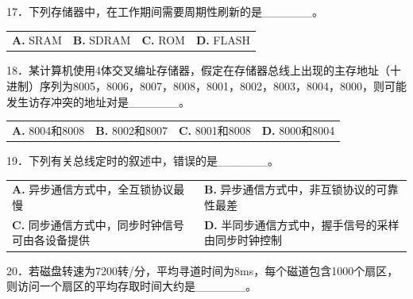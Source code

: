 \documentclass[UTF8,11pt]{ctexart}
\begin{document}
17．下列存储器中，在工作期间需要周期性刷新的是\_\_\_\_\_\_。


\begin{center}\begin{tabular}{>{\raggedright\arraybackslash}p{\dimexpr(\linewidth-8\tabcolsep)/4\relax}>{\raggedright\arraybackslash}p{\dimexpr(\linewidth-8\tabcolsep)/4\relax}>{\raggedright\arraybackslash}p{\dimexpr(\linewidth-8\tabcolsep)/4\relax}>{\raggedright\arraybackslash}p{\dimexpr(\linewidth-8\tabcolsep)/4\relax}}
\textbf{A.} SRAM & \textbf{B.} SDRAM & \textbf{C.} ROM & \textbf{D.} FLASH\\[.35em]\end{tabular}\end{center}

18．某计算机使用4体交叉编址存储器，假定在存储器总线上出现的主存地址（十进制）序列为8005，8006，8007，8008，8001，8002，8003，8004，8000，则可能发生访存冲突的地址对是\_\_\_\_\_\_。


\begin{center}\begin{tabular}{>{\raggedright\arraybackslash}p{\dimexpr(\linewidth-8\tabcolsep)/4\relax}>{\raggedright\arraybackslash}p{\dimexpr(\linewidth-8\tabcolsep)/4\relax}>{\raggedright\arraybackslash}p{\dimexpr(\linewidth-8\tabcolsep)/4\relax}>{\raggedright\arraybackslash}p{\dimexpr(\linewidth-8\tabcolsep)/4\relax}}
\textbf{A.} 8004和8008 & \textbf{B.} 8002和8007 & \textbf{C.} 8001和8008 & \textbf{D.} 8000和8004\\[.35em]\end{tabular}\end{center}

19．下列有关总线定时的叙述中，错误的是\_\_\_\_\_\_。


\begin{center}\begin{tabular}{>{\raggedright\arraybackslash}p{\dimexpr(\linewidth-4\tabcolsep)/2\relax}>{\raggedright\arraybackslash}p{\dimexpr(\linewidth-4\tabcolsep)/2\relax}}
\textbf{A.} 异步通信方式中，全互锁协议最慢 & \textbf{B.} 异步通信方式中，非互锁协议的可靠性最差\\[.35em]
\textbf{C.} 同步通信方式中，同步时钟信号可由各设备提供 & \textbf{D.} 半同步通信方式中，握手信号的采样由同步时钟控制\\[.35em]\end{tabular}\end{center}

20．若磁盘转速为7200转/分，平均寻道时间为8ms，每个磁道包含1000个扇区，则访问一个扇区的平均存取时间大约是\_\_\_\_\_\_。
\end{document}
